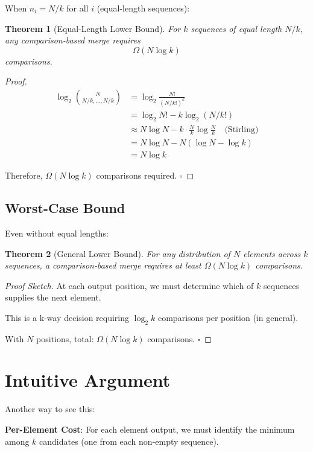 \documentclass[11pt]{article}
\newtheorem{theorem}{Theorem}
\begin{document}
When $n_i = N/k$ for all $i$ (equal-length sequences):

\begin{theorem}[Equal-Length Lower Bound]
For $k$ sequences of equal length $N/k$, any comparison-based merge requires
\[
\Omega(N \log k)
\]
comparisons.
\end{theorem}

\begin{proof}
\begin{align*}
\log_2 \binom{N}{N/k, \ldots, N/k} &= \log_2 \frac{N!}{(N/k!)^k} \\
&= \log_2 N! - k \log_2(N/k!) \\
&\approx N \log N - k \cdot \frac{N}{k} \log \frac{N}{k} \quad \text{(Stirling)} \\
&= N \log N - N(\log N - \log k) \\
&= N \log k
\end{align*}

Therefore, $\Omega(N \log k)$ comparisons required. $\square$
\end{proof}

\subsection{Worst-Case Bound}

Even without equal lengths:

\begin{theorem}[General Lower Bound]
For any distribution of $N$ elements across $k$ sequences, a comparison-based merge requires at least $\Omega(N \log k)$ comparisons.
\end{theorem}

\begin{proof}[Proof Sketch]
At each output position, we must determine which of $k$ sequences supplies the next element.

This is a k-way decision requiring $\log_2 k$ comparisons per position (in general).

With $N$ positions, total: $\Omega(N \log k)$ comparisons. $\square$
\end{proof}

\section{Intuitive Argument}

Another way to see this:

\textbf{Per-Element Cost}: For each element output, we must identify the minimum among $k$ candidates (one from each non-empty sequence).
\end{document}
